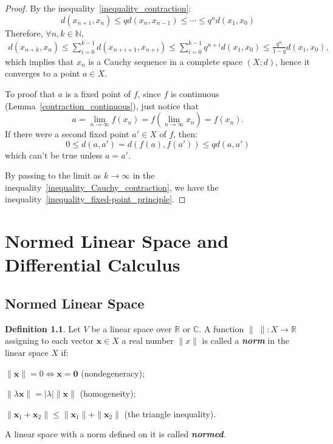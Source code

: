 \documentclass[openany]{book}
\newcommand*{\indexbf}[1]{\emph{\textbf{#1}}\index{#1}} %
\theoremstyle{plain}
\theoremstyle{definition}
\newtheorem{definition}{Definition}[section] %
\begin{document}
\begin{proof}
By the inequality~\ref{inequality_contraction}:
\[
d ( x_{n+1}, x_n) \leq q d( x_n, x_{n-1})
\leq \cdots 
\leq q^n d( x_1, x_0)
\]
Therefore, $\forall n, k \in \mathbb{N}$, 
\begin{align}\label{inequality_Cauchy_contraction}
	d ( x_{n+k}, x_n) \leq 
	\sum^{k-1}_{i=0} d( x_{n+i+1}, x_{n+i}) \leq
	\sum^{k-1}_{i=0} q^{n+i} d( x_1, x_0) \leq
	\frac{q^n}{1-q} d( x_1, x_0),
\end{align}
which implies that ${ x_n}$ is a Cauchy sequence in a complete space $(X;d)$, hence it converges to a point $a \in X$.

To proof that $a$ is a fixed point of $f$, since $f$ is continuous (Lemma~\ref{contraction_continuous}), just notice that 
\[
	a = \lim_{n\to \infty} f(x_n) = 
	f( \lim_{n\to \infty} x_n) = f( x_n).
\]
If there were a second fixed point $a'\in X$ of $f$, then:
\[
	0 \leq d( a, a')  = d( f(a), f(a') ) \leq q d( a, a')
\]
which can't be true unless $a = a'$. 

By passing to the limit as $k \to \infty$ in the inequality~\ref{inequality_Cauchy_contraction}, we have the inequality~\ref{inequality_fixed-point_principle}.
\end{proof}

\chapter{Normed Linear Space and Differential Calculus}
\section{Normed Linear Space}
\begin{definition}
Let $V$ be a linear space over $\mathbb{R}$ or $\mathbb{C}$. A function $\|\;\|: X\to \mathbb{R}$ assigning to each vector $\boldsymbol{x}\in X$ a real number $\|x\|$ is called a \indexbf{norm} in the linear space $X$ if:
\begin{conditionlist}[label=\alph*)]
	\item 
	$\|\boldsymbol{x}\|=0\Leftrightarrow \boldsymbol{x}=\boldsymbol{0}$ (nondegeneracy);
	\item
	$\|\lambda \boldsymbol{x}\| = |\lambda|\|\boldsymbol{x}\|$ (homogeneity);
	\item
	$\|\boldsymbol{x}_1+\boldsymbol{x}_2\|\leq 
	\|\boldsymbol{x}_1\|+\|\boldsymbol{x}_2\|$ (the triangle inequality).
\end{conditionlist}	
A linear space with a norm defined on it is called \indexbf{normed}.
\end{definition}

\backmatter
\nocite{*} %
\printbibliography[heading=bibliography, title={Bibliography}]

\printindex[symbol]

\printindex
\end{document}
